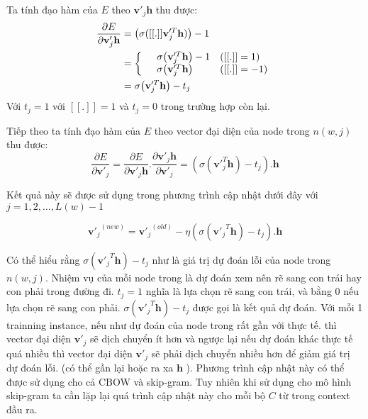 Ta tính đạo hàm của $E$ theo $\textbf{v}'_j\textbf{h}$ thu được:
\begin{equation}
\begin{split}
\dfrac{\partial E}{\partial \textbf{v}'_j\textbf{h}} &= \left( \sigma{([[.]] \textbf{v}'^{T}_{j} \textbf{h})}  \right) - 1 \\
&= \left\{ \begin{array}{l l}
    \quad \sigma{ \left( \textbf{v}'^{T}_{j} \textbf{h}\right) } - 1 &  ([[.]] = 1)\\
    \quad \sigma{ \left( \textbf{v}'^{T}_{j} \textbf{h}\right) } &  ([[.]] = -1) \\
  \end{array} \right. \\
&= \sigma{ \left( \textbf{v}'^{T}_{j} \textbf{h}\right) } - t_j\\
\end{split}
\end{equation}
Với $t_j=1$ với $[[.]] = 1 $ và $t_j=0$ trong trường hợp còn lại.

Tiếp theo ta tính đạo hàm của $E$ theo vector đại diện của node trong $n(w,j)$ thu được:
\begin{equation}
\dfrac{\partial{E}}{\partial{\textbf{v}'_{j}}} = \dfrac{\partial{E}}{\partial{\textbf{v}'_{j} \textbf{h}}} . \dfrac{\partial{\textbf{v}'_{j} \textbf{h}}}{\partial{\textbf{v}'_{j}}} = \left( \sigma  \left( \textbf{v}'^{T}_{j} \textbf{h}\right) - t_j \right) . \textbf{h}
\end{equation}

Kết quả này sẽ được sử dụng trong phương trình cập nhật dưới đây với $j=1,2 ,…,L(w)-1$

\begin{equation}
{\textbf{v}'_{j}}^{(new)} = {\textbf{v}'_{j}}^{(old)} - \eta \left( \sigma \left( {\textbf{v}'_{j}}^{T} \textbf{h}\right) - t_j \right) . \textbf{h}
\end{equation}

Có thể hiểu rằng $\sigma \left( {\textbf{v}'_{j}}^{T} \textbf{h} \right) - t_j $ như là giá trị dự đoán lỗi của node trong $n(w,j)$.  Nhiệm vụ của mỗi node trong là dự đoán xem nên rẽ sang con trái hay con phải trong đường đi. $t_j=1$ nghĩa là lựa chọn rẽ sang con trái, và bằng 0 nếu lựa chọn rẽ sang con phải. $\sigma \left( {\textbf{v}'_{j}}^{T} \textbf{h} \right) - t_j $ được gọi là kết quả dự đoán. Với mỗi 1 trainning instance, nếu như dự đoán của node trong rất gần với thực tế. thì vector đại diện $\textbf{v}'_{j}$ sẽ dịch chuyển ít hơn và ngược lại nếu dự đoán khác thực tế quá nhiều thì vector đại diện $ \textbf{v}'_{j} $ sẽ phải dịch chuyển nhiều hơn để giảm giá trị dự đoán lỗi. (có thể gần lại hoặc ra xa $ \textbf{h} $ ).  Phương trình cập nhật này có thể được sử dụng cho cả CBOW và skip-gram. Tuy nhiên khi sử dụng cho mô hình skip-gram ta cần lặp lại quá trình cập nhật này cho mỗi bộ $C$ từ trong context đầu ra.

